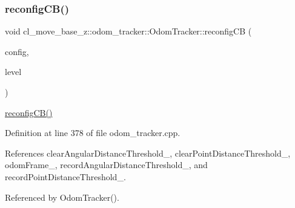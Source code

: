 \mbox{\label{classcl__move__base__z_1_1odom__tracker_1_1OdomTracker_adb06a17455b8d545034d8845706e2886}} 
\subsubsection{\texorpdfstring{reconfig\+C\+B()}{reconfigCB()}}
{\footnotesize\ttfamily void cl\+\_\+move\+\_\+base\+\_\+z\+::odom\+\_\+tracker\+::\+Odom\+Tracker\+::reconfig\+CB (\begin{DoxyParamCaption}\item[{move\+\_\+base\+\_\+z\+\_\+client\+\_\+plugin\+::\+Odom\+Tracker\+Config \&}]{config,  }\item[{uint32\+\_\+t}]{level }\end{DoxyParamCaption})\hspace{0.3cm}{\ttfamily [protected]}}

\hyperlink{classcl__move__base__z_1_1odom__tracker_1_1OdomTracker_adb06a17455b8d545034d8845706e2886}{reconfig\+C\+B()} 

Definition at line 378 of file odom\+\_\+tracker.\+cpp.



References clear\+Angular\+Distance\+Threshold\+\_\+, clear\+Point\+Distance\+Threshold\+\_\+, odom\+Frame\+\_\+, record\+Angular\+Distance\+Threshold\+\_\+, and record\+Point\+Distance\+Threshold\+\_\+.



Referenced by Odom\+Tracker().



